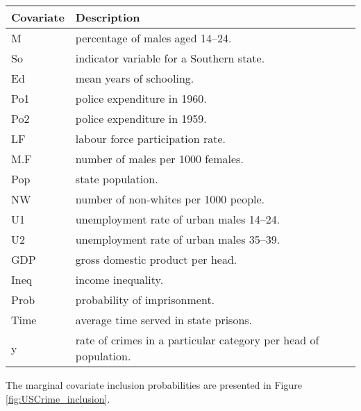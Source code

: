 \documentclass{amsart}[12pt]
\begin{document}
\begin{tabular}{|ll|}
	\hline
	Covariate & Description                                                     \\
	\hline
	M         & percentage of males aged 14–24.                               \\
	So        & indicator variable for a Southern state.                        \\
	Ed        & mean years of schooling.                                        \\
	Po1       & police expenditure in 1960.                                     \\
	Po2       & police expenditure in 1959.                                     \\
	LF        & labour force participation rate.                                \\
	M.F       & number of males per 1000 females.                               \\
	Pop       & state population.                                               \\
	NW        & number of non-whites per 1000 people.                           \\
	U1        & unemployment rate of urban males 14–24.                       \\
	U2        & unemployment rate of urban males 35–39.                       \\
	GDP       & gross domestic product per head.                                \\
	Ineq      & income inequality.                                              \\
	Prob      & probability of imprisonment.                                    \\
	Time      & average time served in state prisons.                           \\
	y         & rate of crimes in a particular category per head of population. \\
	\hline
\end{tabular}

The marginal covariate inclusion probabilities are presented in Figure \ref{fig:USCrime_inclusion}.

\end{document}
